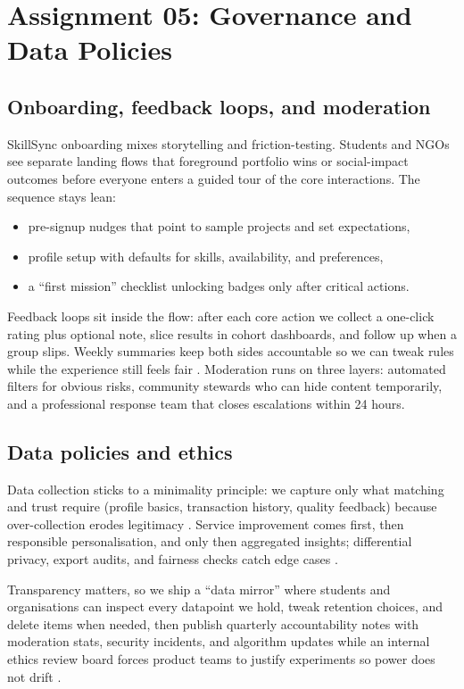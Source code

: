 \section*{Assignment 05: Governance and Data Policies}

\subsection*{Onboarding, feedback loops, and moderation}
SkillSync onboarding mixes storytelling and friction-testing. Students and NGOs see separate landing flows that foreground portfolio wins or social-impact outcomes before everyone enters a guided tour of the core interactions. The sequence stays lean:
\begin{itemize}
  \item pre-signup nudges that point to sample projects and set expectations,
  \item profile setup with defaults for skills, availability, and preferences,
  \item a ``first mission'' checklist unlocking badges only after critical actions.
\end{itemize}

Feedback loops sit inside the flow: after each core action we collect a one-click rating plus optional note, slice results in cohort dashboards, and follow up when a group slips. Weekly summaries keep both sides accountable so we can tweak rules while the experience still feels fair \citep{Reillier2017}. Moderation runs on three layers: automated filters for obvious risks, community stewards who can hide content temporarily, and a professional response team that closes escalations within 24 hours.

\subsection*{Data policies and ethics}
Data collection sticks to a minimality principle: we capture only what matching and trust require (profile basics, transaction history, quality feedback) because over-collection erodes legitimacy \citep{Zuboff2019}. Service improvement comes first, then responsible personalisation, and only then aggregated insights; differential privacy, export audits, and fairness checks catch edge cases \citep{Srnicek2017}.

Transparency matters, so we ship a ``data mirror'' where students and organisations can inspect every datapoint we hold, tweak retention choices, and delete items when needed, then publish quarterly accountability notes with moderation stats, security incidents, and algorithm updates while an internal ethics review board forces product teams to justify experiments so power does not drift \citep{Choudary2016,Lecture10}.

